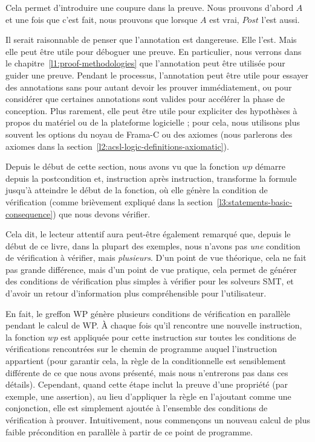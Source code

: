 Cela permet d'introduire une coupure dans la preuve. Nous prouvons d'abord $A$ et
une fois que c'est fait, nous prouvons que lorsque $A$ est vrai, $Post$ l'est
aussi.


Il serait raisonnable de penser que l'annotation  est
dangereuse. Elle l'est. Mais elle peut être utile pour déboguer une preuve.
En particulier, nous verrons dans le chapitre~\ref{l1:proof-methodologies} que
l'annotation  peut être utilisée pour guider une preuve.
Pendant le processus, l'annotation  peut être utile pour
essayer des annotations sans pour autant devoir les prouver immédiatement, ou
pour considérer que certaines annotations sont valides pour accélérer la phase
de conception. Plus rarement, elle peut être utile pour expliciter des
hypothèses à propos du matériel ou de la plateforme logicielle ; pour cela,
nous utilisons plus souvent les options du noyau de Frama-C ou des axiomes
(nous parlerons des axiomes dans la section~\ref{l2:acsl-logic-definitions-axiomatic}).




Depuis le début de cette section, nous avons vu que la fonction $wp$ démarre
depuis la postcondition et, instruction après instruction, transforme la formule
jusqu'à atteindre le début de la fonction, où elle génère la condition de
vérification (comme brièvement expliqué dans la
section~\ref{l3:statements-basic-consequence}) que nous devons vérifier.


Cela dit, le lecteur attentif aura peut-être également remarqué que, depuis le
début de ce livre, dans la plupart des exemples, nous n'avons pas \textit{une}
condition de vérification à vérifier, mais \textit{plusieurs}. D'un point de vue
théorique, cela ne fait pas grande différence, mais d'un point de vue pratique,
cela permet de générer des conditions de vérification plus simples à vérifier
pour les solveurs SMT, et d'avoir un retour d'information plus compréhensible
pour l'utilisateur.


En fait, le greffon WP génère plusieurs conditions de vérification en parallèle
pendant le calcul de WP. À chaque fois qu'il rencontre une nouvelle instruction,
la fonction $wp$ est appliquée pour cette instruction sur toutes les conditions
de vérifications rencontrées sur le chemin de programme auquel l'instruction
appartient (pour garantir cela, la règle de la conditionnelle est sensiblement
différente de ce que nous avons présenté, mais nous n'entrerons pas dans ces
détails). Cependant, quand cette étape inclut la preuve d'une propriété (par
exemple, une assertion), au lieu d'appliquer la règle en l'ajoutant comme une
conjonction, elle est simplement ajoutée à l'ensemble des conditions de
vérification à prouver. Intuitivement, nous commençons un nouveau calcul de plus
faible précondition en parallèle à partir de ce point de programme.


